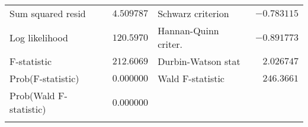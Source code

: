 \begin{tabular}{lrrrr}
\multicolumn{1}{l}{Sum squared resid}&\multicolumn{1}{r}{$4.509787$}&\multicolumn{2}{l}{Schwarz criterion}&\multicolumn{1}{r}{$-0.783115$}\\
\multicolumn{1}{l}{Log likelihood}&\multicolumn{1}{r}{$120.5970$}&\multicolumn{2}{l}{Hannan-Quinn criter.}&\multicolumn{1}{r}{$-0.891773$}\\
\multicolumn{1}{l}{F-statistic}&\multicolumn{1}{r}{$212.6069$}&\multicolumn{2}{l}{Durbin-Watson stat}&\multicolumn{1}{r}{$2.026747$}\\
\multicolumn{1}{l}{Prob(F-statistic)}&\multicolumn{1}{r}{$0.000000$}&\multicolumn{2}{l}{Wald F-statistic}&\multicolumn{1}{r}{$246.3661$}\\
\multicolumn{1}{l}{Prob(Wald F-statistic)}&\multicolumn{1}{r}{$0.000000$}&\multicolumn{1}{c}{}&\multicolumn{1}{c}{}&\multicolumn{1}{c}{}\\
[4.5pt] \hline \\ [-4.5pt]
\end{tabular}
